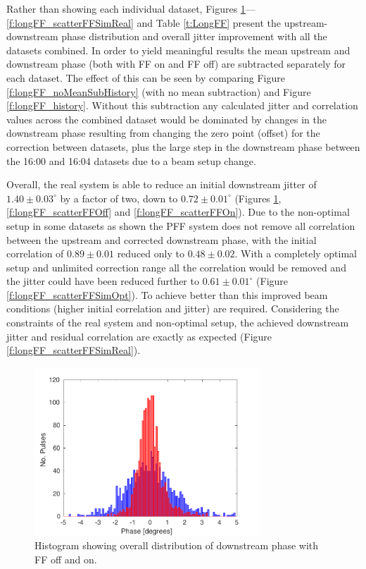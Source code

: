 Rather than showing each individual dataset, Figures \ref{f:longFF_histDownstreamPhase}---\ref{f:longFF_scatterFFSimReal} and Table \ref{t:LongFF} present the upstream-downstream phase distribution and overall jitter improvement with all the datasets combined. In order to yield meaningful results the mean upstream and downstream phase (both with FF on and FF off) are subtracted separately for each dataset. The effect of this can be seen by comparing Figure \ref{f:longFF_noMeanSubHistory} (with no mean subtraction) and Figure \ref{f:longFF_history}. Without this subtraction any calculated jitter and correlation values across the combined dataset would be dominated by changes in the downstream phase resulting from changing the zero point (offset) for the correction between datasets, plus the large step in the downstream phase between the 16:00 and 16:04 datasets due to a beam setup change. 

Overall, the real system is able to reduce an initial downstream jitter of \(1.40\pm0.03^\circ\) by a factor of two, down to \(0.72\pm0.01^\circ\) (Figures \ref{f:longFF_histDownstreamPhase}, \ref{f:longFF_scatterFFOff} and \ref{f:longFF_scatterFFOn}). Due to the non-optimal setup in some datasets as shown the PFF system does not remove all correlation between the upstream and corrected downstream phase, with the initial correlation of \(0.89\pm0.01\) reduced only to \(0.48\pm0.02\). With a completely optimal setup and unlimited correction range all the correlation would be removed and the jitter could have been reduced further to \(0.61\pm0.01^\circ\) (Figure \ref{f:longFF_scatterFFSimOpt}). To achieve better than this improved beam conditions (higher initial correlation and jitter) are required. Considering the constraints of the real system and non-optimal setup, the achieved downstream jitter and residual correlation are exactly as expected (Figure \ref{f:longFF_scatterFFSimReal}).

\begin{figure}
  \centering
  \includegraphics[width=0.75\textwidth]{Figures/feedforward/longFF_histDownstreamPhase}
  \caption{Histogram showing overall distribution of downstream phase with FF off and on.}
  \label{f:longFF_histDownstreamPhase}
\end{figure}

